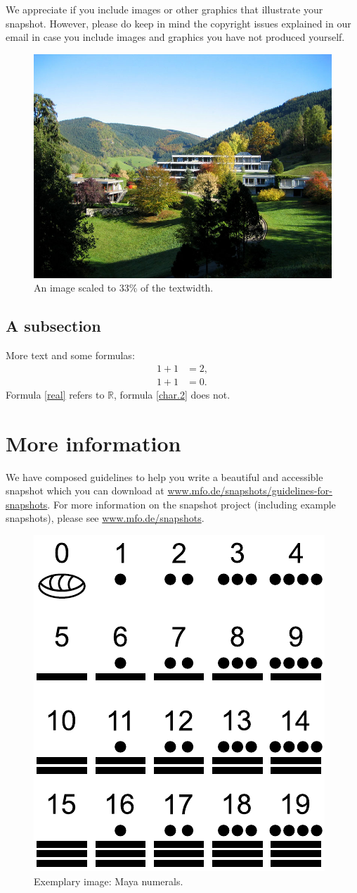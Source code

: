 \documentclass{snapshotmfo}
\begin{document}
We appreciate if you include images or other graphics that illustrate your snapshot. However, please do keep in mind the copyright issues explained in our email in case you include images and graphics you have not produced yourself.

\begin{figure}[ht]
        \centering 
        \includegraphics[width= 0.33 \textwidth]{mfo.jpg}
        \caption{An image scaled to 33\% of the textwidth.}
\label{fig:sample-image}
\end{figure}

\subsection{A subsection}
More text and some formulas:
\begin{align}\label{real}
1+1&=2,\\\label{char.2}
1+1&=0.
\end{align}
Formula \eqref{real} refers to $\mathbb{R}$, formula \eqref{char.2} does not.

\section{More information}
We have composed guidelines to help you write a beautiful and accessible snapshot which you can download at \href{http://www.mfo.de/snapshots/guidelines-for-snapshots}{www.mfo.de/snapshots/guidelines-for-snapshots}. For more information on the snapshot project (including example snapshots), please see \href{http://www.mfo.de/snapshots}{www.mfo.de/snapshots}.

\begin{figure}[ht]
        \centering 
        \includegraphics[width= 0.33 \textwidth]{maya.pdf}
        \caption{Exemplary image: Maya numerals.}
\label{fig:maya}
\end{figure}
\end{document}
